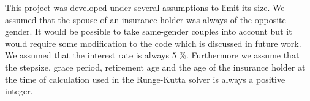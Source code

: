 
This project was developed under several assumptions to limit its size. We assumed that the spouse of an insurance holder was always of the opposite gender. It would be possible to take same-gender couples into account but it would require some modification to the code which is discussed in future work. We assumed that the interest rate is always 5 \%. Furthermore we assume that the stepsize, grace period, retirement age and the age of the insurance holder at the time of calculation used in the Runge-Kutta solver is always a positive integer.